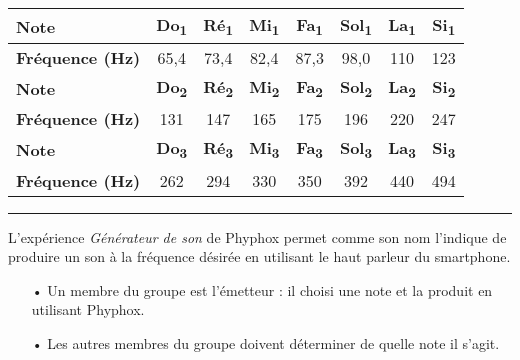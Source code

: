 \documentclass[12pt,a4paper]{article}
\begin{document}
\begin{center}
\begin{tabular}{l|c|c|c|c|c|c|c}
\textbf{Note}						& \textbf{Do\textsubscript{1}} & \textbf{Ré\textsubscript{1}} & \textbf{Mi\textsubscript{1}} & \textbf{Fa\textsubscript{1}} & \textbf{Sol\textsubscript{1}} & \textbf{La\textsubscript{1}} & \textbf{Si\textsubscript{1}} \\
\hline
\textbf{Fréquence (Hz)} 	& 65{,}4 & 73{,}4 & 82{,}4 & 87{,}3 & 98{,}0 & 110 & 123 \\
\hline \hline
\textbf{Note}						& \textbf{Do\textsubscript{2}} & \textbf{Ré\textsubscript{2}} & \textbf{Mi\textsubscript{2}} & \textbf{Fa\textsubscript{2}} & \textbf{Sol\textsubscript{2}} & \textbf{La\textsubscript{2}} & \textbf{Si\textsubscript{2}} \\
\hline
\textbf{Fréquence (Hz)} 	& 131 & 147 & 165 & 175 & 196 & 220 & 247 \\
\hline \hline
\textbf{Note}						& \textbf{Do\textsubscript{3}} & \textbf{Ré\textsubscript{3}} & \textbf{Mi\textsubscript{3}} & \textbf{Fa\textsubscript{3}} & \textbf{Sol\textsubscript{3}} & \textbf{La\textsubscript{3}} & \textbf{Si\textsubscript{3}} \\
\hline
\textbf{Fréquence (Hz)} 	& 262 & 294 & 330 & 350 & 392 & 440 & 494
\end{tabular}
\end{center}

\vspace{5pt}
\hrule{}
\vspace{5pt}

L'expérience \emph{Générateur de son} de Phyphox permet comme son nom l'indique de produire un son à la fréquence désirée en utilisant le haut parleur du smartphone.
\begin{itemize}
\item[•] Un membre du groupe est l'émetteur : il choisi une note et la produit en utilisant Phyphox.
\item[•] Les autres membres du groupe doivent déterminer de quelle note il s'agit.
\end{itemize}
\end{document}
